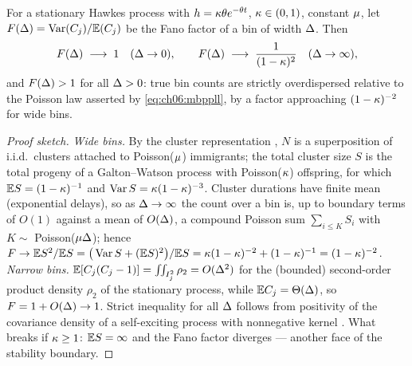 \begin{proposition}\label{prop:ch06:overdisp}
For a stationary Hawkes process with $h = \kappa\theta
e^{-\theta t}$, $\kappa\in(0,1)$, constant $\mu$, let
$F(\Delta) = \operatorname{Var}(C_j)/\mathbb{E}(C_j)$ be the Fano factor of a bin of width
$\Delta$. Then
\begin{equation}\label{eq:ch06:fano}
F(\Delta) \;\longrightarrow\; 1 \quad (\Delta \to 0),
\qquad
F(\Delta) \;\longrightarrow\; \frac{1}{(1-\kappa)^2}
\quad (\Delta \to \infty),
\end{equation}
and $F(\Delta) > 1$ for all $\Delta > 0$: true bin counts are strictly
overdispersed relative to the Poisson law asserted by
\cref{eq:ch06:mbppll}, by a factor approaching $(1-\kappa)^{-2}$ for wide
bins.
\end{proposition}

\begin{proof}[Proof sketch]
\emph{Wide bins.} By the cluster representation
\citep{hawkesoakes1974}, $N$ is a superposition of i.i.d.\ clusters
attached to Poisson($\mu$) immigrants; the total cluster size $S$ is the
total progeny of a Galton--Watson process with Poisson($\kappa$)
offspring, for which $\mathbb{E} S = (1-\kappa)^{-1}$ and
$\operatorname{Var} S = \kappa(1-\kappa)^{-3}$. Cluster durations have finite mean
(exponential delays), so as $\Delta\to\infty$ the count over a bin is,
up to boundary terms of $O(1)$ against a mean of $O(\Delta)$, a compound
Poisson sum $\sum_{i\le K} S_i$ with $K\sim$ Poisson($\mu\Delta$);
hence
$F \to \mathbb{E} S^2/\mathbb{E} S = \big(\operatorname{Var} S + (\mathbb{E} S)^2\big)/\mathbb{E} S =
\kappa(1-\kappa)^{-2} + (1-\kappa)^{-1} = (1-\kappa)^{-2}$.
\emph{Narrow bins.} $\mathbb{E}[C_j(C_j-1)] = \iint_{I_j^2}\rho_2 = O(\Delta^2)$
for the (bounded) second-order product density $\rho_2$ of the stationary
process, while $\mathbb{E} C_j = \Theta(\Delta)$, so
$F = 1 + O(\Delta) \to 1$. Strict inequality for all $\Delta$ follows
from positivity of the covariance density of a self-exciting process with
nonnegative kernel \citep{hawkes1971,daley2003}. What breaks if
$\kappa \ge 1$: $\mathbb{E} S = \infty$ and the Fano factor diverges --- another
face of the stability boundary.
\end{proof}

